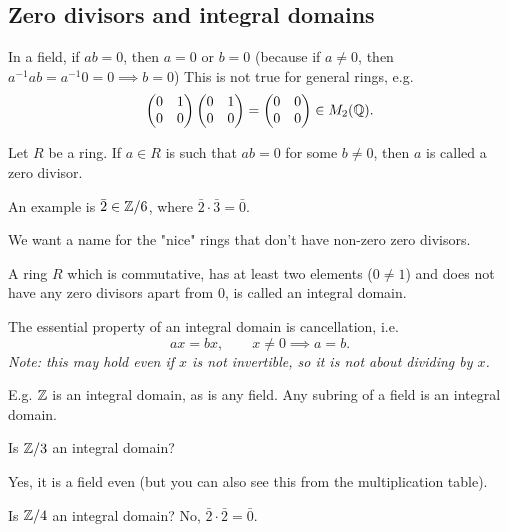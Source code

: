 \documentclass[10pt, a4paper]{article}
\begin{document}
\subsection{Zero divisors and integral domains}
In a field,
if $ab = 0$,
then $a = 0$ or $b = 0$
(because if $a \neq 0$,
then $a ^ {-1}ab = a ^ {-1}0 = 0 \implies b = 0$)
This is not true for general rings,
e.g.
\[
\begin{pmatrix}
    0 & 1 \\ 0 & 0
\end{pmatrix}
\begin{pmatrix}
    0 & 1 \\ 0 & 0
\end{pmatrix} =
\begin{pmatrix}
    0 & 0 \\ 0 & 0
\end{pmatrix} \in M_{2}(\mathbb{Q}).
\]

\begin{definition}
    Let $R$ be a ring.
    If $a \in R$ is such that $ab = 0$ for some $b \neq 0$,
    then $a$ is called a zero divisor.
\end{definition}
An example is $\bar{2} \in \mathbb{Z} / 6$,
where $\bar{2} \cdot \bar{3} = \bar{0}$.

We want a name for the "nice" rings that don't have non-zero zero divisors.
\begin{definition}
    A ring $R$ which is commutative,
    has at least two elements
    ($0 \neq 1$)
    and does not have any zero divisors apart from $0$,
    is called an integral domain.
\end{definition}

The essential property of an integral domain is cancellation,
i.e.
\[
ax = bx,\qquad x \neq 0 \implies a = b.
\]
\textit{Note:
this may hold even if $x$ is not invertible,
so it is not about dividing by $x$.}

E.g.
$\mathbb{Z}$ is an integral domain,
as is any field.
Any subring of a field is an integral domain.

\begin{example}
    Is $\mathbb{Z} / 3$ an integral domain?

    Yes,
    it is a field even
    (but you can also see this from the multiplication table).

    Is $\mathbb{Z} / 4$ an integral domain?
    No,
    $\bar{2} \cdot \bar{2} = \bar{0}$.
\end{example}
\end{document}
